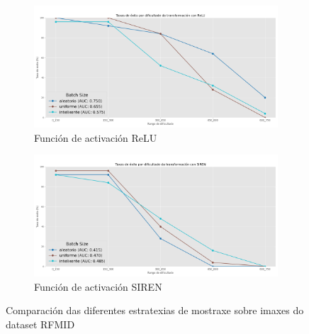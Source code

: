 \begin{figure}[tbp]
    \centering
    \begin{subfigure}[b]{0.48\textwidth}
        \centering
        \includegraphics[width=\textwidth]{imaxes/muestraje/experiment_plot_RFMID_st_relu.png}
        \caption{Función de activación ReLU}
        \label{fig:sampling_types_relu}
    \end{subfigure}\hfill
    \begin{subfigure}[b]{0.48\textwidth}
        \centering
        \includegraphics[width=\textwidth]{imaxes/muestraje/experiment_plot_RFMID_st_SIREN.png}
        \caption{Función de activación SIREN}
        \label{fig:sampling_types_siren}
    \end{subfigure}
    \caption{Comparación das diferentes estratexias de mostraxe sobre imaxes do dataset RFMID}
    \label{fig:sampling_types_comparisons}
\end{figure}





